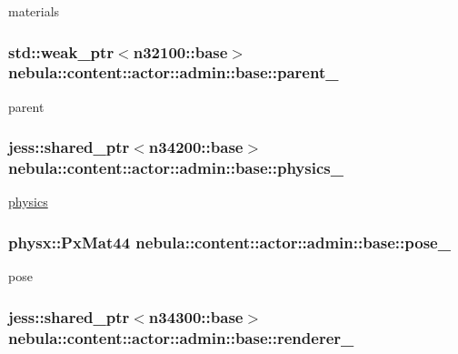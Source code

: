 materials \hypertarget{classnebula_1_1content_1_1actor_1_1admin_1_1base_a01662fd8d19fcaabbdb52047d32e4bbb}{
\subsubsection[{parent\_\-}]{\setlength{\rightskip}{0pt plus 5cm}std::weak\_\-ptr$<${\bf n32100::base}$>$ {\bf nebula::content::actor::admin::base::parent\_\-}}}
\label{classnebula_1_1content_1_1actor_1_1admin_1_1base_a01662fd8d19fcaabbdb52047d32e4bbb}


parent \hypertarget{classnebula_1_1content_1_1actor_1_1admin_1_1base_a13e0d1622350f3f4ae7bec2c98825265}{
\subsubsection[{physics\_\-}]{\setlength{\rightskip}{0pt plus 5cm}jess::shared\_\-ptr$<${\bf n34200::base}$>$ {\bf nebula::content::actor::admin::base::physics\_\-}}}
\label{classnebula_1_1content_1_1actor_1_1admin_1_1base_a13e0d1622350f3f4ae7bec2c98825265}


\hyperlink{namespacenebula_1_1content_1_1actor_1_1physics}{physics} \hypertarget{classnebula_1_1content_1_1actor_1_1admin_1_1base_a414a98d747d9ad841eb16a4c0997d98c}{
\subsubsection[{pose\_\-}]{\setlength{\rightskip}{0pt plus 5cm}physx::PxMat44 {\bf nebula::content::actor::admin::base::pose\_\-}}}
\label{classnebula_1_1content_1_1actor_1_1admin_1_1base_a414a98d747d9ad841eb16a4c0997d98c}


pose \hypertarget{classnebula_1_1content_1_1actor_1_1admin_1_1base_a5940a5eebf157377f758715bfa26fa5a}{
\subsubsection[{renderer\_\-}]{\setlength{\rightskip}{0pt plus 5cm}jess::shared\_\-ptr$<${\bf n34300::base}$>$ {\bf nebula::content::actor::admin::base::renderer\_\-}}}
\label{classnebula_1_1content_1_1actor_1_1admin_1_1base_a5940a5eebf157377f758715bfa26fa5a}


